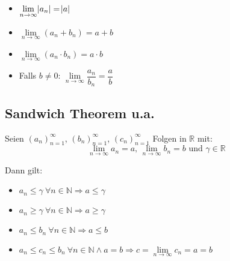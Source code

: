 \documentclass[12pt]{article}
\begin{document}
    \begin{itemize}
        \item $\lim\limits_{n \rightarrow \infty} \abs{a_n} = \abs{a}$
        \item $\lim\limits_{n \rightarrow \infty}(a_n + b_n) = a + b$
        \item $\lim\limits_{n \rightarrow \infty}(a_n \cdot b_n) = a \cdot b$
        \item Falls $b \neq 0$:
        $\lim\limits_{n \rightarrow \infty}\dfrac{a_n}{b_n} = \dfrac{a}{b}$
    \end{itemize}

    \subsection{Sandwich Theorem u.a.}
    Seien ${(a_n)}_{n=1}^\infty$, ${(b_n)}_{n=1}^\infty$, ${(c_n)}_{n=1}^\infty$
    Folgen in $\mathbb{R}$ mit:
    \begin{equation*}
        \lim_{n \rightarrow \infty}a_n = a \text{, }
        \lim_{n \rightarrow \infty}b_n = b \text{ und } \gamma \in \mathbb{R}
    \end{equation*}

    Dann gilt:

    \begin{itemize}
        \item $a_n \leq \gamma\ \forall n \in \mathbb{N} \Rightarrow a \leq \gamma$
        \item $a_n \geq \gamma\ \forall n \in \mathbb{N} \Rightarrow a \geq \gamma$
        \item $a_n \leq b_n\ \forall n \in \mathbb{N} \Rightarrow a \leq b$
        \item $a_n \leq c_n \leq b_n\ \forall n \in \mathbb{N} \wedge a=b
        \Rightarrow c=\lim\limits_{n \rightarrow \infty} c_n = a = b$
    \end{itemize}
\end{document}
